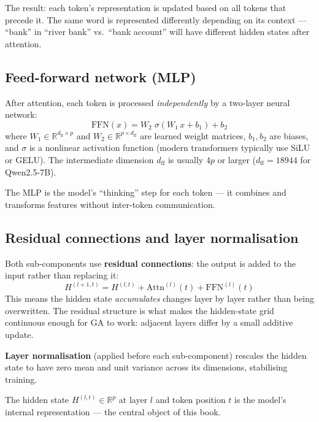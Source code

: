 \documentclass[11pt, twoside, openright]{memoir}
\numberwithin{equation}{chapter}
\begin{document}
The result: each token's representation is updated based on all tokens
that precede it.  The same word is represented differently depending on
its context --- ``bank'' in ``river bank'' vs.\ ``bank account'' will
have different hidden states after attention.

\subsection*{Feed-forward network (MLP)}

After attention, each token is processed \emph{independently} by a
two-layer neural network:
\begin{equation}
  \mathrm{FFN}(x) = W_2 \;\sigma(W_1 \, x + b_1) + b_2
\end{equation}
where $W_1 \in \mathbb{R}^{d_{\mathrm{ff}} \times p}$ and
$W_2 \in \mathbb{R}^{p \times d_{\mathrm{ff}}}$ are learned weight
matrices, $b_1, b_2$ are biases, and $\sigma$ is a nonlinear
activation function (modern transformers typically use
SiLU or GELU).  The intermediate dimension
$d_{\mathrm{ff}}$ is usually $4p$ or larger ($d_{\mathrm{ff}} = 18944$
for Qwen2.5-7B).

The MLP is the model's ``thinking'' step for each token --- it combines
and transforms features without inter-token communication.

\subsection*{Residual connections and layer normalisation}

Both sub-components use \textbf{residual connections}: the output is
added to the input rather than replacing it:
\begin{equation}
  H^{(l+1,t)} = H^{(l,t)} + \mathrm{Attn}^{(l)}(t) + \mathrm{FFN}^{(l)}(t)
\end{equation}
This means the hidden state \emph{accumulates} changes layer by layer
rather than being overwritten.  The residual structure is what makes the
hidden-state grid continuous enough for GA to work: adjacent layers
differ by a small additive update.

\textbf{Layer normalisation} (applied before each sub-component)
rescales the hidden state to have zero mean and unit variance across
its dimensions, stabilising training.

The hidden state $H^{(l, t)} \in \mathbb{R}^p$ at layer $l$ and token
position $t$ is the model's internal representation --- the central
object of this book.
\end{document}
